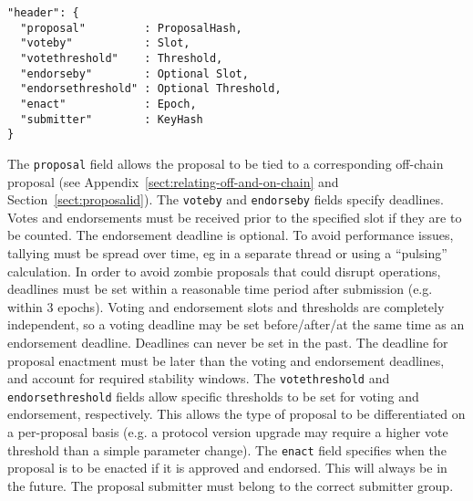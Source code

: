 \begin{verbatim}
"header": {
  "proposal"         : ProposalHash,
  "voteby"           : Slot,
  "votethreshold"    : Threshold,
  "endorseby"        : Optional Slot,
  "endorsethreshold" : Optional Threshold,
  "enact"            : Epoch,
  "submitter"        : KeyHash
}
\end{verbatim}

The \texttt{proposal} field allows the proposal to be tied to a corresponding off-chain proposal (see Appendix~\ref{sect:relating-off-and-on-chain} and Section~\ref{sect:proposalid}).  The \texttt{voteby} and \texttt{endorseby} fields specify deadlines.
Votes and endorsements must be received prior to the specified slot if they are to be counted.  The endorsement deadline is optional.
To avoid performance issues, tallying must be spread over time, eg in a separate thread or using a ``pulsing'' calculation.
In order to avoid zombie proposals that could disrupt operations, deadlines must be set within a reasonable time period after submission (e.g. within 3 epochs).
Voting and endorsement slots and thresholds are completely independent, so a voting deadline may be set before/after/at the same time as an endorsement deadline.
Deadlines can never be set in the past.
The deadline for proposal enactment must be later than the  voting and endorsement deadlines, and account for required stability windows.
%
The \texttt{votethreshold} and \texttt{endorsethreshold} fields allow specific thresholds to be set for voting and endorsement, respectively.  This allows the type of proposal to be differentiated on a per-proposal basis
(e.g. a protocol version upgrade may require a higher vote threshold than a simple parameter change).
%
The \texttt{enact} field specifies when the proposal is to be enacted if it is approved and endorsed.  This will always be in the future.
%
The proposal submitter must belong to the correct submitter group.  

